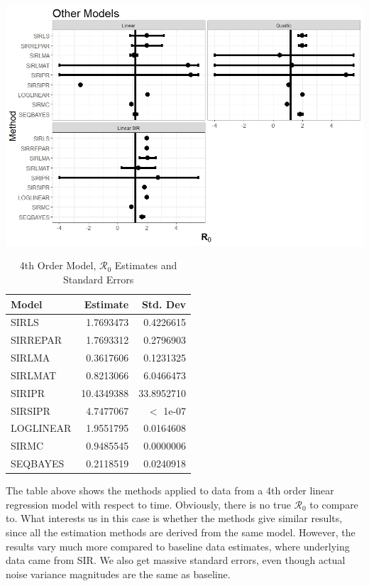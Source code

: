 \message{ !name(draft_v13.tex)}\documentclass[12pt]{article}
\newcommand{\rr}{\ensuremath{\mathcal{R}_0}}
\begin{document}
\begin{table}[H]

  \begin{center}
\includegraphics[scale=0.5]{images/other.jpeg}

\end{center}

\caption{\label{tab:} 4th Order Model, $\rr$ Estimates and Standard Errors}
\centering
\begin{tabular}[t]{l|r|r}
	\hline
	Model & Estimate & Std. Dev\\
	\hline
	SIRLS & 1.7693473 & 0.4226615\\
	\hline
	SIRREPAR & 1.7693312 & 0.2796903\\
	\hline
	SIRLMA & 0.3617606 & 0.1231325\\
	\hline
	SIRLMAT & 0.8213066 & 6.0466473\\
	\hline
	SIRIPR & 10.4349388 & 33.8952710\\
	\hline
	SIRSIPR & 4.7477067 &  $<$ 1e-07\\
	\hline
	LOGLINEAR & 1.9551795 & 0.0164608\\
	\hline
	SIRMC & 0.9485545 & 0.0000006\\
	\hline
	SEQBAYES & 0.2118519 & 0.0240918\\
	\hline
\end{tabular}
\end{table}

The table above shows the methods applied to data from a 4th order linear regression model with respect to time. Obviously, there is no true $\rr$ to compare to. What interests us in this case is whether the methods give similar results, since all the estimation methods are derived from the same model. However, the results vary much more compared to baseline data estimates, where underlying data came from SIR. We also get massive standard errors, even though actual noise variance magnitudes are the same as baseline.
\end{document}
